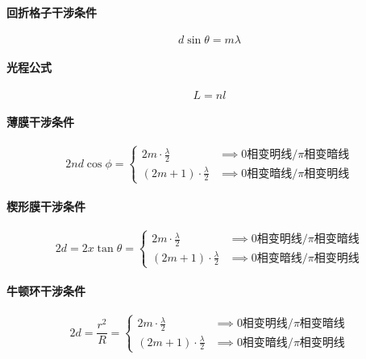 \paragraph{回折格子干涉条件}
\begin{equation*}
    d\sin\theta=m\lambda
\end{equation*}

\paragraph{光程公式}
\begin{equation*}
    L=nl
\end{equation*}

\paragraph{薄膜干涉条件}
\begin{equation*}
    2nd\cos\phi=
    \begin{cases}
        2m\cdot\frac{\lambda}{2}&\implies
        \textrm{0相变明线/}\pi\textrm{相变暗线}\\
        (2m+1)\cdot\frac{\lambda}{2}&\implies
        \textrm{0相变暗线/}\pi\textrm{相变明线}
    \end{cases}
\end{equation*}

\paragraph{楔形膜干涉条件}
\begin{equation*}
    2d=2x\tan\theta=
    \begin{cases}
        2m\cdot\frac{\lambda}{2}&\implies
        \textrm{0相变明线/}\pi\textrm{相变暗线}\\
        (2m+1)\cdot\frac{\lambda}{2}&\implies
        \textrm{0相变暗线/}\pi\textrm{相变明线}
    \end{cases}
\end{equation*}

\paragraph{牛顿环干涉条件}
\begin{equation*}
    2d=\frac{r^2}{R}=
    \begin{cases}
        2m\cdot\frac{\lambda}{2}&\implies
        \textrm{0相变明线/}\pi\textrm{相变暗线}\\
        (2m+1)\cdot\frac{\lambda}{2}&\implies
        \textrm{0相变暗线/}\pi\textrm{相变明线}
    \end{cases}
\end{equation*}

